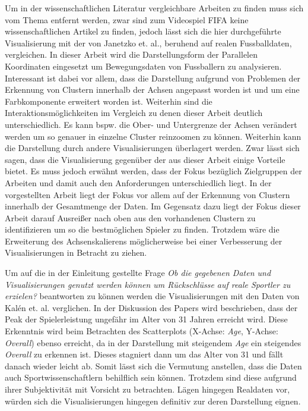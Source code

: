 \documentclass[usegeometry=true]{scrartcl}
\begin{document}
Um in der wissenschaftlichen Literatur vergleichbare Arbeiten zu finden muss sich vom Thema entfernt werden, zwar sind zum Videospiel FIFA keine wissenschaftlichen Artikel zu finden, jedoch lässt sich die hier durchgeführte Visualisierung mit der von Janetzko et. al.\cite{janetzko_enhancing_2016}, beruhend auf realen Fussballdaten, vergleichen.
In dieser Arbeit wird die Darstellungsform der Parallelen Koordinaten eingesetzt um Bewegungsdaten von Fussballern zu analysieren. Interessant ist dabei vor allem, dass die Darstellung aufgrund von Problemen der Erkennung von Clustern innerhalb der Achsen angepasst worden ist und um eine Farbkomponente erweitert worden ist. Weiterhin sind die Interaktionsmöglichkeiten im Vergleich zu denen dieser Arbeit deutlich unterschiedlich. Es kann bspw. die Ober- und Untergrenze der Achsen verändert werden um so genauer in einzelne Cluster reinzoomen zu können. Weiterhin kann die Darstellung durch andere Visualisierungen überlagert werden.
Zwar lässt sich sagen, dass die Visualisierung gegenüber der aus dieser Arbeit einige Vorteile bietet. Es muss jedoch erwähnt werden, dass der Fokus bezüglich Zielgruppen der Arbeiten und damit auch den Anforderungen unterschiedlich liegt. In der vorgestellten Arbeit liegt der Fokus vor allem auf der Erkennung von Clustern innerhalb der Gesamtmenge der Daten. Im Gegensatz dazu liegt der Fokus dieser Arbeit darauf Ausreißer nach oben aus den vorhandenen Clustern zu identifizieren um so die bestmöglichen Spieler zu finden. Trotzdem wäre die Erweiterung des Achsenskalierens möglicherweise bei einer Verbesserung der Visualisierungen in Betracht zu ziehen.

Um auf die in der Einleitung gestellte Frage \textit{Ob die gegebenen Daten und Visualisierungen genutzt werden können um Rückschlüsse auf reale Sportler zu erzielen?} beantworten zu können werden die Visualisierungen mit den Daten von Kalén et. al.\cite{kalen_are_2019} verglichen. In der Diskussion des Papers wird beschrieben, dass der Peak der Spielerleistung ungefähr im Alter von 31 Jahren erreicht wird. Diese Erkenntnis wird beim Betrachten des Scatterplots (X-Achse: \textit{Age}, Y-Achse: \textit{Overall}) ebenso erreicht, da in der Darstellung mit steigendem \textit{Age} ein steigendes \textit{Overall} zu erkennen ist. Dieses stagniert dann um das Alter von 31 und fällt danach wieder leicht ab. Somit lässt sich die Vermutung anstellen, dass die Daten auch Sportwissenschaftlern behilflich sein können. Trotzdem sind diese aufgrund ihrer Subjektivität mit Vorsicht zu betrachten. Lägen hingegen Realdaten vor, würden sich die Visualisierungen hingegen definitiv zur deren Darstellung eignen.    
\end{document}
